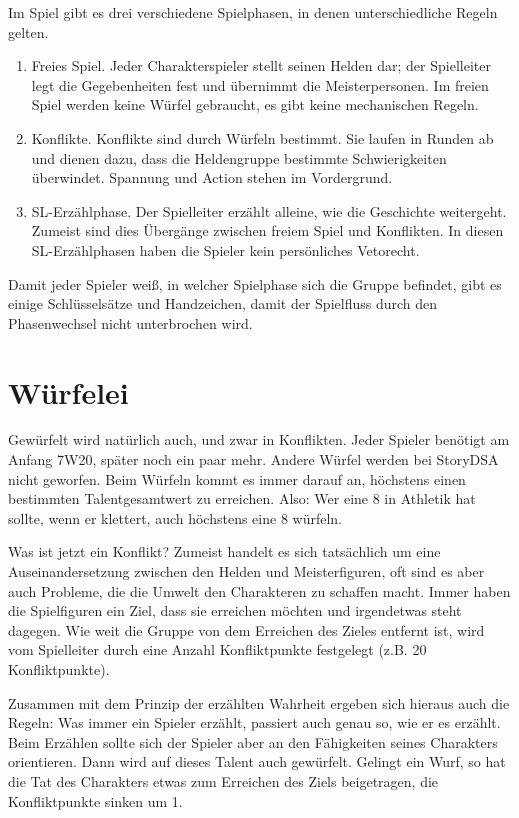 Im Spiel gibt es drei verschiedene Spielphasen, in denen unterschiedliche Regeln gelten.
\begin{enumerate}
\item Freies Spiel. Jeder Charakterspieler stellt seinen Helden dar; der Spielleiter legt die Gegebenheiten fest und übernimmt die Meisterpersonen. Im freien Spiel werden keine Würfel gebraucht, es gibt keine mechanischen Regeln.
\item Konflikte. Konflikte sind durch Würfeln bestimmt. Sie laufen in Runden ab und dienen dazu, dass die Heldengruppe bestimmte Schwierigkeiten überwindet. Spannung und Action stehen im Vordergrund.
\item SL-Erzählphase. Der Spielleiter erzählt alleine, wie die Geschichte weitergeht. Zumeist sind dies Übergänge zwischen freiem Spiel und Konflikten. In diesen SL-Erzählphasen haben die Spieler kein persönliches Vetorecht.
\end{enumerate}

Damit jeder Spieler weiß, in welcher Spielphase sich die Gruppe befindet, gibt es einige Schlüsselsätze und Handzeichen, damit der Spielfluss durch den Phasenwechsel nicht unterbrochen wird.

\section{Würfelei}

Gewürfelt wird natürlich auch, und zwar in Konflikten. Jeder Spieler benötigt am Anfang 7W20, später noch ein paar mehr. Andere Würfel werden bei StoryDSA nicht geworfen. Beim Würfeln kommt es immer darauf an, höchstens einen bestimmten Talentgesamtwert zu erreichen. Also: Wer eine 8 in Athletik hat sollte, wenn er klettert, auch höchstens eine 8 würfeln.

Was ist jetzt ein Konflikt? Zumeist handelt es sich tatsächlich um eine Auseinandersetzung zwischen den Helden und Meisterfiguren, oft sind es aber auch Probleme, die die Umwelt den Charakteren zu schaffen macht. Immer haben die Spielfiguren ein Ziel, dass sie erreichen möchten und irgendetwas steht dagegen. Wie weit die Gruppe von dem Erreichen des Zieles entfernt ist, wird vom Spielleiter durch eine Anzahl Konfliktpunkte festgelegt (z.B. 20 Konfliktpunkte).

Zusammen mit dem Prinzip der erzählten Wahrheit ergeben sich hieraus auch die Regeln: Was immer ein Spieler erzählt, passiert auch genau so, wie er es erzählt. Beim Erzählen sollte sich der Spieler aber an den Fähigkeiten seines Charakters orientieren. Dann wird auf dieses Talent auch gewürfelt. Gelingt ein Wurf, so hat die Tat des Charakters etwas zum Erreichen des Ziels beigetragen, die Konfliktpunkte sinken um 1.

